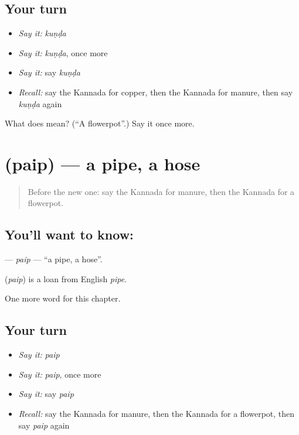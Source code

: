 \subsection*{Your turn}
\begin{itemize}
\raggedright
  \item \emph{Say it:} \emph{kuṇḍa}
  \item \emph{Say it:} \emph{kuṇḍa}, once more
  \item \emph{Say it:} say \emph{kuṇḍa}
  \item \emph{Recall:} say the Kannada for copper, then the Kannada for manure, then say \emph{kuṇḍa} again
\end{itemize}

\begin{tcolorbox}[breakable,colback=teal!4,colframe=teal!35!black,title={Before you move on}]
What does  mean? (\textquotedblleft{}A flowerpot\textquotedblright{}.) Say it once more.
\end{tcolorbox}
\section[\texorpdfstring{\kn{ಪೈಪ್} (paip)}{ಪೈಪ್ (paip)}]{ (paip) — a pipe, a hose}

\label{lesson:KA-C267-paip}



\begin{quote}
Before the new one: say the Kannada for manure, then the Kannada for a flowerpot.
\end{quote}

\subsection*{You'll want to know: }
\textbf{} — \emph{paip} — \textquotedblleft{}a pipe, a hose\textquotedblright{}.

\begin{cousinweb}
\textbf{} (\emph{paip}) is a loan from English \emph{pipe}.
\end{cousinweb}

\begin{grammarlens}[title={What you've built}]
One more word for this chapter.
\end{grammarlens}

\subsection*{Your turn}
\begin{itemize}
\raggedright
  \item \emph{Say it:} \emph{paip}
  \item \emph{Say it:} \emph{paip}, once more
  \item \emph{Say it:} say \emph{paip}
  \item \emph{Recall:} say the Kannada for manure, then the Kannada for a flowerpot, then say \emph{paip} again
\end{itemize}

